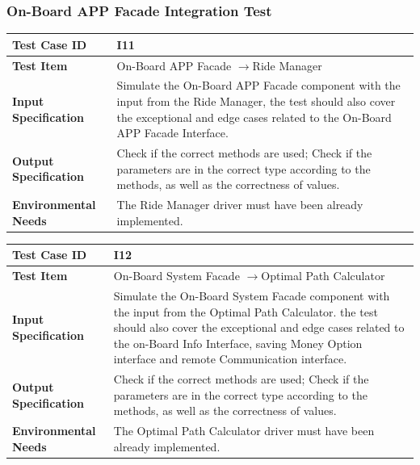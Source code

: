 \documentclass[a4paper,11pt]{article}
\begin{document}
		\subsubsection{On-Board APP Facade Integration Test}
		\begin{table}[H] 
\begin{center}
\renewcommand\arraystretch{1.5}
\begin{tabular}{|p{5cm}|p{7cm}|}
 \hline
\textbf{Test Case ID}& I11\\
 \hline
\textbf{Test Item}&On-Board APP Facade $\rightarrow$Ride Manager\\
 \hline
\textbf{Input Specification}&Simulate the On-Board APP Facade component with the input from the Ride Manager, the test should also cover the exceptional and edge cases related to the On-Board APP Facade Interface.\\
 \hline
\textbf{Output Specification}&Check if the correct methods are used;
Check if the parameters are in the correct type according to the methods, as well as the correctness of values.\\
 \hline
 \textbf{Environmental Needs}&The Ride Manager driver must have been already implemented.\\
 \hline
\end{tabular}
\end{center}
\end{table}		
\begin{table}[H] 
\begin{center}
\renewcommand\arraystretch{1.5}
\begin{tabular}{|p{5cm}|p{7cm}|}
 \hline
\textbf{Test Case ID}& I12\\
 \hline
\textbf{Test Item}&On-Board System Facade $\rightarrow$Optimal Path Calculator\\
 \hline
\textbf{Input Specification}&Simulate the On-Board System Facade component with the input from the Optimal Path Calculator. the test should also cover the exceptional and edge cases related to the on-Board Info Interface, saving Money Option interface and remote Communication interface.\\
 \hline
\textbf{Output Specification}&Check if the correct methods are used;
Check if the parameters are in the correct type according to the methods, as well as the correctness of values.\\
 \hline
 \textbf{Environmental Needs}&The Optimal Path Calculator driver must have been already implemented.\\
 \hline
\end{tabular}
\end{center}
\end{table}		
\end{document}
